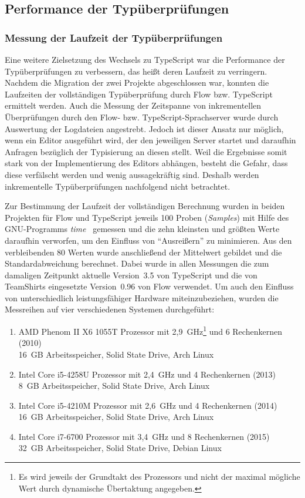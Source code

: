 \subsection{Performance der Typüberprüfungen}

\subsubsection{Messung der Laufzeit der Typüberprüfungen}

Eine weitere Zielsetzung des Wechsels zu TypeScript war die Performance der Typüberprüfungen zu verbessern, das heißt deren Laufzeit zu verringern. Nachdem die Migration der zwei Projekte abgeschlossen war, konnten die Laufzeiten der vollständigen Typüberprüfung durch Flow bzw. TypeScript ermittelt werden. Auch die Messung der Zeitspanne von inkrementellen Überprüfungen durch den Flow- bzw. TypeScript-Sprachserver wurde durch Auswertung der Logdateien angestrebt. Jedoch ist dieser Ansatz nur möglich, wenn ein Editor ausgeführt wird, der den jeweiligen Server startet und daraufhin Anfragen bezüglich der Typisierung an diesen stellt. Weil die Ergebnisse somit stark von der Implementierung des Editors abhängen, besteht die Gefahr, dass diese verfälscht werden und wenig aussagekräftig sind. Deshalb werden inkrementelle Typüberprüfungen nachfolgend nicht betrachtet.

Zur Bestimmung der Laufzeit der vollständigen Berechnung wurden in beiden Projekten für Flow und TypeScript jeweils 100 Proben (\textit{Samples}) mit Hilfe des GNU-Programms \textit{time}~\autocite{GNU_TIME} gemessen und die zehn kleinsten und größten Werte daraufhin verworfen, um den Einfluss von \enquote{Ausreißern} zu minimieren. Aus den verbleibenden 80 Werten wurde anschließend der Mittelwert gebildet und die Standardabweichung berechnet. Dabei wurde in allen Messungen die zum damaligen Zeitpunkt aktuelle Version~3.5 von TypeScript und die von TeamShirts eingesetzte Version~0.96 von Flow verwendet. Um auch den Einfluss von unterschiedlich leistungsfähiger Hardware miteinzubeziehen, wurden die Messreihen auf vier verschiedenen Systemen durchgeführt:

\begin{enumerate}[label=\Alph*.]
  \item AMD Phenom II X6 1055T Prozessor mit 2,9~GHz\footnote{Es wird jeweils der Grundtakt des Prozessors und nicht der maximal mögliche Wert durch dynamische Übertaktung angegeben.} und 6 Rechenkernen (2010)\\16~GB Arbeitsspeicher, Solid State Drive, Arch Linux
  \item Intel Core i5-4258U Prozessor mit 2,4~GHz und 4 Rechenkernen (2013)\\8~GB Arbeitsspeicher, Solid State Drive, Arch Linux
  \item Intel Core i5-4210M Prozessor mit 2,6~GHz und 4 Rechenkernen (2014)\\16~GB Arbeitsspeicher, Solid State Drive, Arch Linux
  \item Intel Core i7-6700 Prozessor mit 3,4~GHz und 8 Rechenkernen (2015)\\32~GB Arbeitsspeicher, Solid State Drive, Debian Linux
\end{enumerate}

